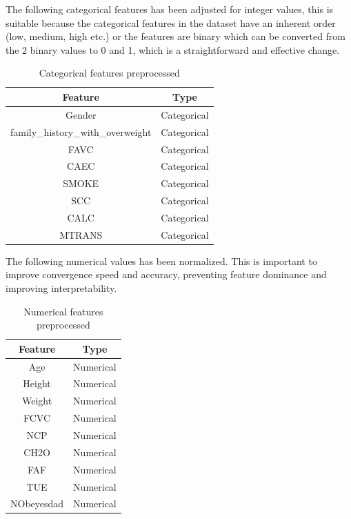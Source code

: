 \documentclass[11pt, a4paper]{article}
\begin{document}
\vspace{1em}The following categorical features has been adjusted for integer values, this is suitable because the categorical features in the dataset have an 
inherent order (low, medium, high etc.) or the features are binary which can be converted from the 2 binary values to 0 and 1, which is a 
straightforward and effective change.

\begin{table}[H]
    \centering
    \begin{tabular}{|c|c|}
        \hline
        \textbf{Feature} & \textbf{Type} \\ \hline
        Gender &  Categorical \\ \hline
        family\_history\_with\_overweight & Categorical \\ \hline
        FAVC &  Categorical \\ \hline
        CAEC &  Categorical \\ \hline
        SMOKE &  Categorical \\ \hline
        SCC &  Categorical \\ \hline
        CALC &  Categorical \\ \hline
        MTRANS &  Categorical \\ \hline
    \end{tabular}
    \caption{Categorical features preprocessed}
    \label{tab:table_categorical_preprocessing}
\end{table}

The following numerical values has been normalized. This is important to improve convergence speed and accuracy, preventing feature dominance and 
improving interpretability.

\begin{table}[H]
    \centering
    \begin{tabular}{|c|c|}
        \hline
        \textbf{Feature} & \textbf{Type} \\ \hline
        Age &  Numerical \\ \hline
        Height &  Numerical \\ \hline
        Weight &  Numerical \\ \hline
        FCVC &  Numerical \\ \hline
        NCP &  Numerical \\ \hline
        CH2O &  Numerical \\ \hline
        FAF &  Numerical \\ \hline
        TUE &  Numerical \\ \hline
        NObeyesdad &  Numerical \\ \hline
    \end{tabular}
    \caption{Numerical features preprocessed}
    \label{tab:table_numerical_preprocessing}
\end{table}
\end{document}
